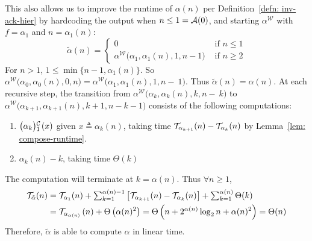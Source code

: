 This also allows us to improve the runtime of $\alpha(n)$ per Definition~\ref{defn: inv-ack-hier} by hardcoding the output when $n\le 1 = \mathcal{A}(0)$, and starting $\alpha^{\mathcal{W}}$ with $f = \alpha_1$ and $n = \alpha_1(n)$:
\begin{equation*}
\tilde{\alpha}(n) = \begin{cases}
0 & \text{ if } n \le 1 \\ \alpha^{\mathcal{W}}\big(\alpha_1, \alpha_1(n), 1, n-1\big) & \text{ if } n \ge 2
\end{cases}
\end{equation*}
For $n > 1$, $1\le \min\big\{n-1, \alpha_1(n)\big\}$. So
$\alpha^{\mathcal{W}}\big(\alpha_0, \alpha_0(n), 0, n\big) =
\alpha^{\mathcal{W}}\big(\alpha_1, \alpha_1(n), 1, n-~1\big)$.
Thus $\tilde{\alpha}(n) = \alpha(n)$. At each recursive step, the transition from $\alpha^{\mathcal{W}}\big(\alpha_k, \alpha_k(n), k, n-~k\big)$ to $\alpha^{\mathcal{W}}\big(\alpha_{k+1}, \alpha_{k+1}(n), k+1, n-k-1\big)$ consists of the following computations:
 \begin{enumerate} %
	\item $\cdt{\big(\alpha_k\big)}{1}(x)$ given $x\triangleq \alpha_k(n)$, taking time $\mathcal{T}_{\alpha_{k+1}}(n) - \mathcal{T}_{\alpha_k}(n)$ by Lemma~\ref{lem: compose-runtime}.
	\item $\alpha_k(n) - k$, taking time $\Theta(k)$
\end{enumerate}
The computation will terminate at $k = \alpha(n)$. Thus $\forall n\ge 1$,
\begin{equation} \label{eq: inv-ack-runtime-improved}
\begin{aligned}
\mathcal{T}_{\tilde{\alpha}}(n)
& = \textstyle \mathcal{T}_{\alpha_1}(n) + \sum_{k=1}^{\alpha(n) - 1}
\left[ \mathcal{T}_{\alpha_{k+1}}(n) - \mathcal{T}_{\alpha_k}(n)
\right] + \sum_{k=1}^{\alpha(n)}\Theta(k) \\
& = \mathcal{T}_{\alpha_{\alpha(n)}}\left(n\right) + \Theta\left(\alpha(n)^2\right)
= \Theta\left(n + 2^{\alpha(n)}\log_2n + \alpha(n)^2\right) = \Theta(n)
\end{aligned}
\end{equation}
Therefore, $\tilde{\alpha}$ is able to compute $\alpha$ in linear time.
